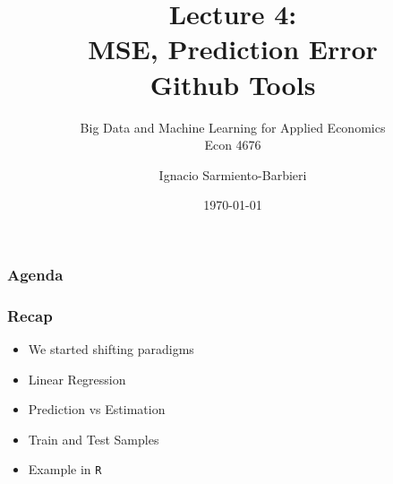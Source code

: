 \documentclass[
  shownotes,
  xcolor={svgnames},
  hyperref={colorlinks,citecolor=DarkBlue,linkcolor=DarkRed,urlcolor=DarkBlue}
  ]{beamer}
\begin{document}
\title[Lecture 4]{Lecture 4: \\ MSE, Prediction Error \\ Github Tools}
\subtitle{Big Data and Machine Learning for Applied Economics \\ Econ 4676}
\date{\today}

\author[Sarmiento-Barbieri]{Ignacio Sarmiento-Barbieri}


\begin{frame}[noframenumbering]
\maketitle
\end{frame}





\begin{frame}
\frametitle{Agenda}

\tableofcontents


\end{frame}



\begin{frame}
\frametitle{Recap}

\begin{itemize} 
    \item We started shifting paradigms
    \bigskip
    \item Linear Regression
    \bigskip
    \item Prediction vs Estimation
    \bigskip
    \item Train and Test Samples
    \bigskip
    \item Example in \texttt{R}
\end{itemize}
\end{frame}



\end{document}
